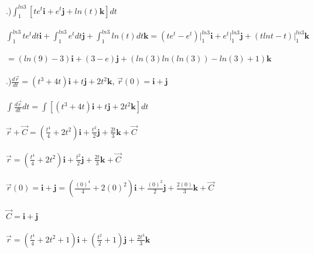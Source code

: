 \documentclass[12pt]{article}
\begin{document}
.)$\int_{1}^{ln{3}}[te^{t}\mathbf{i} + e^{t}\mathbf{j} + ln(t)\mathbf{k}]dt$\\\\
\noindent $\int_{1}^{ln{3}}te^{t}dt\mathbf{i} + \int_{1}^{ln{3}}e^{t}dt\mathbf{j} + \int_{1}^{ln{3}}ln(t)dt\mathbf{k} = (te^{t} - e^{t})\Big|_1^{ln{3}}\mathbf{i} + e^{t}\Big|_1^{ln{3}}\mathbf{j}  + (tln{t} - t)\Big|_1^{ln{3}}\mathbf{k}$\\\\
\noindent $=(ln(9) - 3)\mathbf{i} + (3 - e)\mathbf{j} + (ln(3)ln(ln(3)) - ln(3)+1)\mathbf{k}$\\\\


.)$\frac{d\vec{r}}{dt} = (t^{3} + 4t)\mathbf{i} + t\mathbf{j} + 2t^{2}\mathbf{k}$, \hspace{10pt} $\vec{r}(0) = \mathbf{i} + \mathbf{j}$\\\\ 
\noindent $\int \frac{d\vec{r}}{dt} dt = \int [(t^{3} + 4t)\mathbf{i} + t\mathbf{j} + 2t^{2}\mathbf{k}] dt$\\\\
\noindent $\vec{r}  + \vec{C}= (\frac{t^{4}}{4} + 2t^{2})\mathbf{i} + \frac{t^{2}}{2}\mathbf{j} + \frac{2t}{3}\mathbf{k} + \vec{C} $\\\\
\noindent $\vec{r} = (\frac{t^{4}}{4} + 2t^{2})\mathbf{i} + \frac{t^{2}}{2}\mathbf{j} + \frac{2t}{3}\mathbf{k} + \vec{C} $\\\\
\noindent $\vec{r}(0) = \mathbf{i} + \mathbf{j} = (\frac{(0)^{4}}{4} + 2(0)^{2})\mathbf{i} + \frac{(0)^{2}}{2}\mathbf{j} + \frac{2(0)}{3}\mathbf{k} + \vec{C} $\\\\
\noindent $\vec{C}  = \mathbf{i} + \mathbf{j} $\\\\
\noindent $\vec{r} =(\frac{t^{4}}{4} + 2t^{2} + 1)\mathbf{i} + (\frac{t^{2}}{2} + 1)\mathbf{j} + \frac{2t^{3}}{3}\mathbf{k}$\\\\
\end{document}
